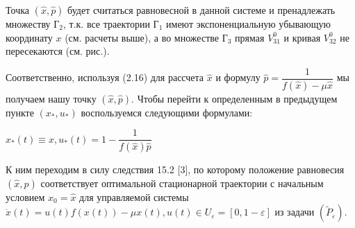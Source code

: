 Точка $ (\hat{x}, \hat{p}) $ будет считаться равновесной в данной системе и пренадлежать множеству Г$_2$, т.к. все траектории Г$_1$ имеют экспоненциальную убывающую координату $ x $ (см. расчеты выше), а во множестве Г$_3$ прямая $  V^0_{31} $ и кривая $ V^0_{32} $ не пересекаются (см. рис.).

Соответственно, используя (2.16) для рассчета $ \hat{x} $ и формулу  $ \hat{p} = \dfrac{1}{f(\hat{x}) - \mu\hat{x}} $ мы получаем нашу точку $ (\hat{x}, \hat{p}) $.
Чтобы перейти к определенным в предыдущем пункте  $ (x_*, u_*) $ воспользуемся следующими формулами:
\begin{center}
	$ x_*(t) \equiv x, u_*(t) =1 - \dfrac{1}{f(\hat{x})\hat{p}}$
\end{center}
К ним переходим в силу следствия 15.2 [3], по которому положение равновесия $ (\hat{x}, \hat{p}) $  соответствует оптимальной стационарной траектории с начальным условием $ x_0 = \hat{x} $ для управляемой системы $ \dot{x}(t) = u(t) f(x(t))-\mu x(t),u (t)\in U_\varepsilon = [0 ,1-\varepsilon] $ из задачи $(\tilde{P}_\varepsilon)$.
